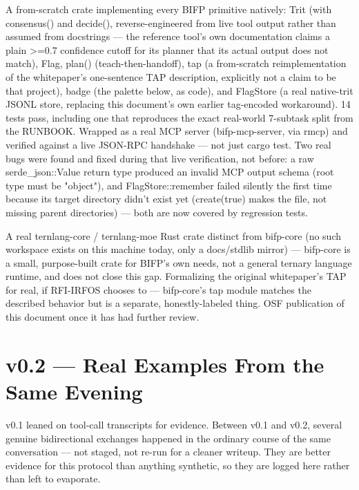 \documentclass[11pt,a4paper]{article}
\begin{document}
\begin{tcolorbox}[winbox, title={6.3 — bifp-core: a real, tested Rust crate, published}]
A from-scratch crate implementing every BIFP primitive natively: Trit (with consensus() and decide(), reverse-engineered from live tool output rather than assumed from docstrings — the reference tool's own documentation claims a plain >=0.7 confidence cutoff for its planner that its actual output does not match), Flag, plan() (teach-then-handoff), tap (a from-scratch reimplementation of the whitepaper's one-sentence TAP description, explicitly not a claim to be that project), badge (the palette below, as code), and FlagStore (a real native-trit JSONL store, replacing this document's own earlier tag-encoded workaround). 14 tests pass, including one that reproduces the exact real-world 7-subtask split from the RUNBOOK. Wrapped as a real MCP server (bifp-mcp-server, via rmcp) and verified against a live JSON-RPC handshake — not just cargo test. Two real bugs were found and fixed during that live verification, not before: a raw serde\_json::Value return type produced an invalid MCP output schema (root type must be "object"), and FlagStore::remember failed silently the first time because its target directory didn't exist yet (create(true) makes the file, not missing parent directories) — both are now covered by regression tests.
\end{tcolorbox}
\vspace{4pt}

\begin{tcolorbox}[lowbox, title={6.4 — Explicitly still future work, not claimed as built}]
A real ternlang-core / ternlang-moe Rust crate distinct from bifp-core (no such workspace exists on this machine today, only a docs/stdlib mirror) — bifp-core is a small, purpose-built crate for BIFP's own needs, not a general ternary language runtime, and does not close this gap. Formalizing the original whitepaper's TAP for real, if RFI-IRFOS chooses to — bifp-core's tap module matches the described behavior but is a separate, honestly-labeled thing. OSF publication of this document once it has had further review.
\end{tcolorbox}
\vspace{4pt}

\section{v0.2 — Real Examples From the Same Evening}
v0.1 leaned on tool-call transcripts for evidence. Between v0.1 and v0.2, several genuine bidirectional exchanges happened in the ordinary course of the same conversation — not staged, not re-run for a cleaner writeup. They are better evidence for this protocol than anything synthetic, so they are logged here rather than left to evaporate.
\end{document}
